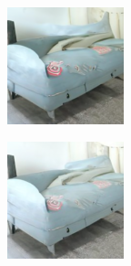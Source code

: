 \documentclass{article}
\begin{document}
\begin{figure}
\begin{subfigure}[b]{0.5\linewidth}
\begin{subfigure}[b]{0.242\linewidth}
        \end{subfigure}
        \begin{subfigure}[b]{0.242\linewidth}
        \includegraphics[width=\linewidth]{figures/imagenet128/solver_samples/imagenet128_fm_ot_214_20.png}
        \end{subfigure}
        \begin{subfigure}[b]{0.242\linewidth}
        \includegraphics[width=\linewidth]{figures/imagenet128/solver_samples/imagenet128_fm_ot_214_50.png}
        \end{subfigure}
    \end{subfigure}\\
    

\end{figure}
\end{document}

